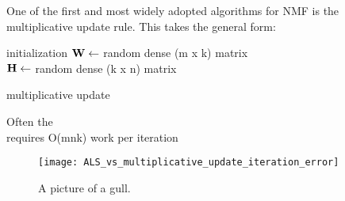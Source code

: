 \documentclass[12pt]{article}
\begin{document}
One of the first and most widely adopted algorithms for NMF is the multiplicative update rule. This takes the general form: \\


\begin{algorithm}[H]

 initialization\;
$\bf{W} \gets $ random dense (m x k) matrix\\
$\bf{H} \gets $ random dense (k x n) matrix\\
 \caption{multiplicative update}
\end{algorithm} 


Often the \\
requires O(mnk) work per iteration

\begin{figure}[h!]
  \caption{A picture of a gull.}
  \centering
    \texttt{[image: ALS\_vs\_multiplicative\_update\_iteration\_error]}
\end{figure}
\end{document}

